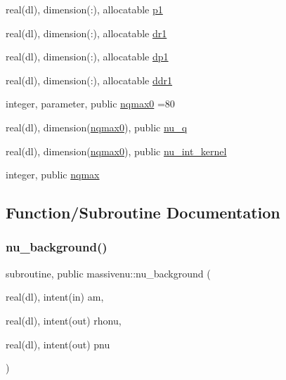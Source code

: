 \begin{DoxyCompactItemize}
\item 
real(dl), dimension(\+:), allocatable \mbox{\hyperlink{namespacemassivenu_a1776e9b553839aa3e0328f3104c8def6}{p1}}
\item 
real(dl), dimension(\+:), allocatable \mbox{\hyperlink{namespacemassivenu_a73078a1de4febfc2142d1518a0045e06}{dr1}}
\item 
real(dl), dimension(\+:), allocatable \mbox{\hyperlink{namespacemassivenu_a2bf645ad1caf3996fa724d4351b0b5a8}{dp1}}
\item 
real(dl), dimension(\+:), allocatable \mbox{\hyperlink{namespacemassivenu_a9d5815d7727b8913cba78eb9fb6d002c}{ddr1}}
\item 
integer, parameter, public \mbox{\hyperlink{namespacemassivenu_ae4e7d71c09007f613d462d593de26cca}{nqmax0}} =80
\item 
real(dl), dimension(\mbox{\hyperlink{namespacemassivenu_ae4e7d71c09007f613d462d593de26cca}{nqmax0}}), public \mbox{\hyperlink{namespacemassivenu_a12570e51825f5cec04f3e7d1fffa7702}{nu\+\_\+q}}
\item 
real(dl), dimension(\mbox{\hyperlink{namespacemassivenu_ae4e7d71c09007f613d462d593de26cca}{nqmax0}}), public \mbox{\hyperlink{namespacemassivenu_addf94ab5a9d895ca27a259f651853eb0}{nu\+\_\+int\+\_\+kernel}}
\item 
integer, public \mbox{\hyperlink{namespacemassivenu_a95412d3036cd184190c2157292ec7732}{nqmax}}
\end{DoxyCompactItemize}


\subsection{Function/\+Subroutine Documentation}
\mbox{\label{namespacemassivenu_a30a55d3fc963ae76797cb114a3bd8818}} 
\subsubsection{\texorpdfstring{nu\+\_\+background()}{nu\_background()}}
{\footnotesize\ttfamily subroutine, public massivenu\+::nu\+\_\+background (\begin{DoxyParamCaption}\item[{real(dl), intent(in)}]{am,  }\item[{real(dl), intent(out)}]{rhonu,  }\item[{real(dl), intent(out)}]{pnu }\end{DoxyParamCaption})}



